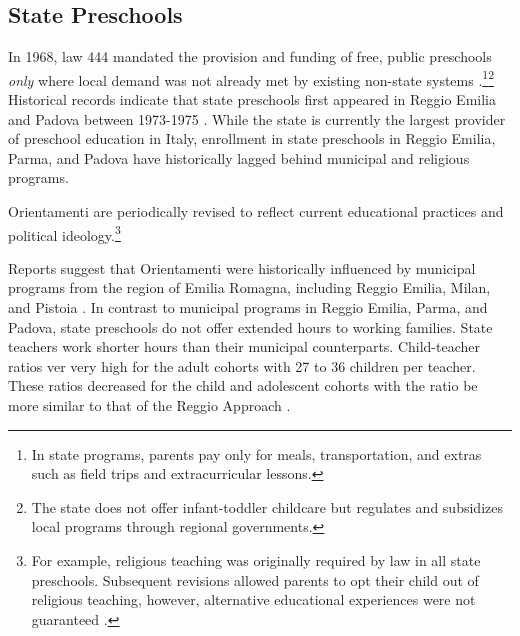 \subsection{State Preschools}
In 1968, law 444 mandated the provision and funding of free, public preschools \textit{only} where local demand was not already met by existing non-state systems \citep{Hohnerlein_2009_Paradox-Public-Preschools}.\footnote{In state programs, parents pay only for meals, transportation, and extras such as field trips and extracurricular lessons.}\footnote{The state does not offer infant-toddler childcare but regulates and subsidizes local programs through regional governments.}  Historical records indicate that state preschools first appeared in Reggio Emilia and Padova between 1973-1975 \citep{Padova-Admin-Data_1964-2011,Reggio-Admin-data_1966-2006,Reggio-Annual-Journals_1994-2011}. While the state is currently the largest provider of preschool education in Italy, enrollment in state preschools in Reggio Emilia, Parma, and Padova have historically lagged behind municipal and religious programs.

Orientamenti are periodically revised to reflect current educational practices and political ideology.\footnote{For example, religious teaching was originally required by law in all state preschools. Subsequent revisions allowed parents to opt their child out of religious teaching, however, alternative educational experiences were not guaranteed \citep{CEHD_2016_Historical-Analysis}.} 

Reports suggest that Orientamenti were historically influenced by municipal programs from the region of Emilia Romagna, including Reggio Emilia, Milan, and Pistoia \citep{OECD_2001_Italy-Country-Note}. In contrast to municipal programs in Reggio Emilia, Parma, and Padova, state preschools do not offer extended hours to working families. State teachers work shorter hours than their municipal counterparts. Child-teacher ratios ver very high for the adult cohorts with 27 to 36 children per teacher. These ratios decreased for the child and adolescent cohorts with the ratio be more similar to that of the Reggio Approach \citep{Hohnerlein_2015_Development-and-Diffusion}.


